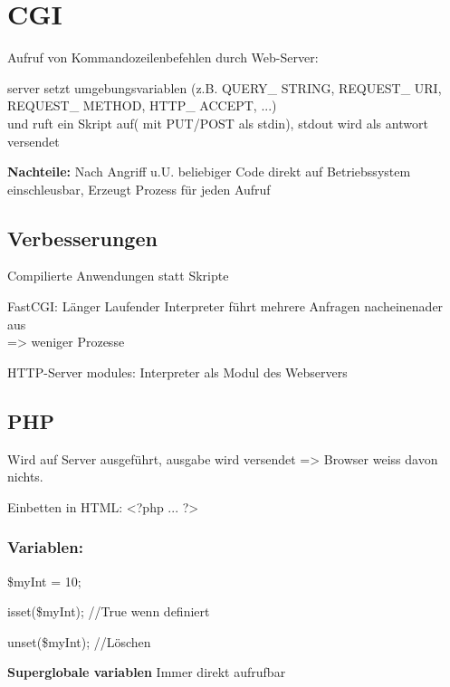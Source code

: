 \section{CGI}
Aufruf von Kommandozeilenbefehlen durch Web-Server: 

server setzt umgebungsvariablen (z.B. QUERY\_ STRING, REQUEST\_ URI, REQUEST\_ METHOD, HTTP\_ ACCEPT, ...) \\ und ruft ein Skript auf( mit PUT/POST als stdin), stdout wird als antwort versendet

\textbf{Nachteile: }Nach Angriff u.U. beliebiger Code direkt auf Betriebssystem einschleusbar, Erzeugt Prozess für jeden Aufruf
\subsection{Verbesserungen}
Compilierte Anwendungen statt Skripte

FastCGI: Länger Laufender Interpreter führt mehrere Anfragen nacheinenader aus \\=> weniger Prozesse

HTTP-Server modules: Interpreter als Modul des Webservers
\subsection{PHP}
Wird auf Server ausgeführt, ausgabe wird versendet => Browser weiss davon nichts.

Einbetten in HTML: <?php ... ?>
\subsubsection{Variablen:}
\$myInt = 10;

isset(\$myInt); //True wenn definiert

unset(\$myInt); //Löschen

\textbf{Superglobale variablen}
Immer direkt aufrufbar 

